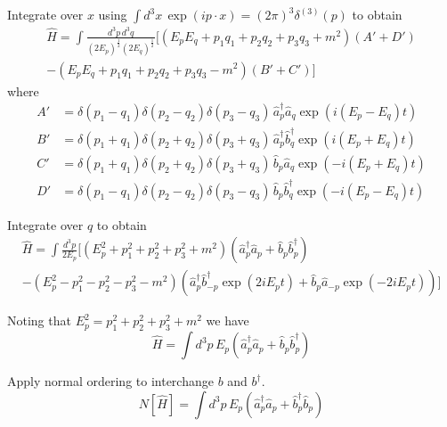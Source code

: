 Integrate over $x$ using $\int d^3x\,\exp(ip\cdot x)=(2\pi)^3\delta^{(3)}(p)$ to obtain
\begin{multline*}
\hat H
=\int\frac{d^3p\,d^3q}{(2E_p)^\frac{1}{2}(2E_q)^\frac{1}{2}}
\bigg[(E_pE_q+p_1q_1+p_2q_2+p_3q_3+m^2)(A'+D')
\\
-(E_pE_q+p_1q_1+p_2q_2+p_3q_3-m^2)(B'+C')\bigg]
\end{multline*}
where
\begin{align*}
A'&=\delta(p_1-q_1)\delta(p_2-q_2)\delta(p_3-q_3)\,\hat a_p^\dag\hat a_q\exp(i(E_p-E_q)t)
\\
B'&=\delta(p_1+q_1)\delta(p_2+q_2)\delta(p_3+q_3)\,\hat a_p^\dag\hat b_q^\dag\exp(i(E_p+E_q)t)
\\
C'&=\delta(p_1+q_1)\delta(p_2+q_2)\delta(p_3+q_3)\,\hat b_p\hat a_q\exp(-i(E_p+E_q)t)
\\
D'&=\delta(p_1-q_1)\delta(p_2-q_2)\delta(p_3-q_3)\,\hat b_p\hat b_q^\dag\exp(-i(E_p-E_q)t)
\end{align*}

Integrate over $q$ to obtain
\begin{multline*}
\hat H=\int\frac{d^3p}{2E_p}
\bigg[(E_p^2+p_1^2+p_2^2+p_3^2+m^2)
\left(\hat a_p^\dag\hat a_p+\hat b_p\hat b_p^\dag\right)
\\
-(E_p^2-p_1^2-p_2^2-p_3^2-m^2)
\left(\hat a_p^\dag\hat b_{-p}^\dag\exp(2iE_pt)+\hat b_p\hat a_{-p}\exp(-2iE_pt)\right)\bigg]
\end{multline*}

Noting that $E_p^2=p_1^2+p_2^2+p_3^2+m^2$ we have
\begin{equation*}
\hat H=\int d^3p\,E_p\left(\hat a_p^\dag\hat a_p+\hat b_p\hat b_p^\dag\right)
\end{equation*}

Apply normal ordering to interchange $b$ and $b^\dag$.
\begin{equation*}
N[\hat H]=\int d^3p\,E_p\left(\hat a_p^\dag\hat a_p+\hat b_p^\dag\hat b_p\right)
\end{equation*}


